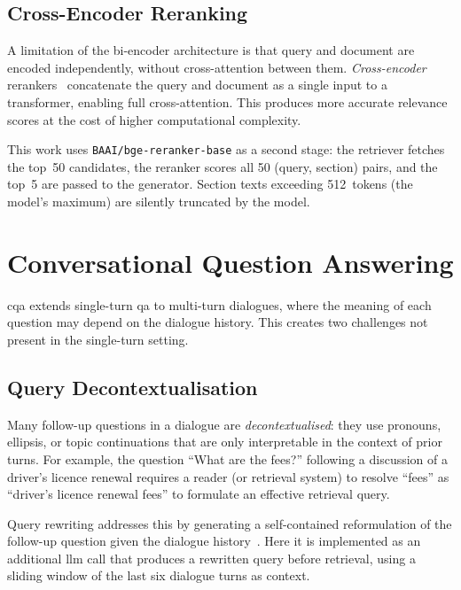 \subsection{Cross-Encoder Reranking}

A limitation of the bi-encoder architecture is that query and document are encoded
independently, without cross-attention between them. \emph{Cross-encoder}
rerankers~\cite{nogueira2020passage} concatenate the query and document as a single
input to a transformer, enabling full cross-attention. This produces more accurate
relevance scores at the cost of higher computational complexity.

This work uses \texttt{BAAI/bge-reranker-base} as a second stage:
the retriever fetches the top~50 candidates, the reranker scores all 50
(query, section) pairs, and the top~5 are passed to the generator.
Section texts exceeding 512~tokens (the model's maximum) are silently truncated by
the model.


\section{Conversational Question Answering}\label{sec:bg:cqa}

\Gls{cqa} extends single-turn \gls{qa} to multi-turn dialogues, where the meaning
of each question may depend on the dialogue history. This creates two challenges
not present in the single-turn setting.

\subsection{Query Decontextualisation}

Many follow-up questions in a dialogue are \emph{decontextualised}: they use
pronouns, ellipsis, or topic continuations that are only interpretable in the
context of prior turns. For example, the question ``What are the fees?'' following
a discussion of a driver's licence renewal requires a reader (or retrieval system)
to resolve ``fees'' as ``driver's licence renewal fees'' to formulate an effective
retrieval query.

Query rewriting addresses this by generating a self-contained reformulation of the
follow-up question given the dialogue history~\cite{yu2020few}. Here it is implemented
as an additional \gls{llm} call that produces a rewritten query before retrieval,
using a sliding window of the last six dialogue turns as context.


